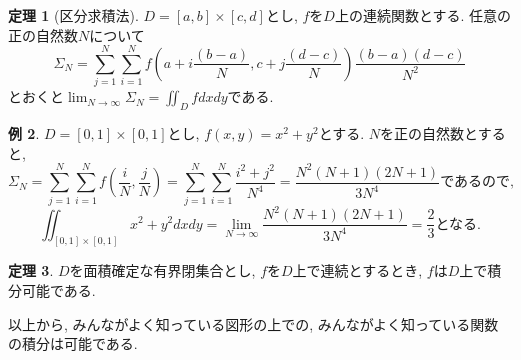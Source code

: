 \documentclass[dvipdfmx,a4paper,11pt]{article}
\theoremstyle{definition}
\newtheorem{thm}{定理}
\newtheorem{exa}[thm]{例}
\newcommand{\pdrv}[2]{\frac{\partial #1}{\partial #2}}
\begin{document}
       \begin{tcolorbox}[
    colback = white,
    colframe = green!35!black,
    fonttitle = \bfseries,
    breakable = true]
    \begin{thm}[区分求積法]
$D=[a,b] \times [c,d]$とし, 
$f$を$D$上の連続関数とする. 任意の正の自然数$N$について
$$
\Sigma_N=\sum_{j=1}^{N}\sum_{i=1}^{N}f\left(  a+i\frac{(b-a)}{N} ,c+j\frac{(d-c)}{N}\right)\frac{(b-a)(d-c)}{N^2}
$$
とおくと$\lim_{N \rightarrow \infty} \Sigma_{N} = \iint_{D} f dxdy$である.
        \end{thm}
    \end{tcolorbox}
\begin{exa}
$D=[0,1]\times [0,1]$とし, $f(x,y)=x^2+y^2$とする.
$N$を正の自然数とすると, 
$$\Sigma_{N}=
\sum_{j=1}^{N}\sum_{i=1}^{N}f\left( \frac{i}{N},\frac{j}{N}\right)
=\sum_{j=1}^{N}\sum_{i=1}^{N}\frac{i^2+j^2}{N^4} = \frac{N^2(N+1)(2N+1)}{3N^4}
\text{であるので, }
$$
$$
\iint_{[0,1]\times [0,1]} x^2+y^2 dxdy = \lim_{N \rightarrow \infty} \frac{N^2(N+1)(2N+1)}{3N^4}
= \frac{2}{3} \text{となる.}
$$

\end{exa}

\begin{tcolorbox}[
    colback = white,
    colframe = green!35!black,
    fonttitle = \bfseries,
    breakable = true]
    \begin{thm}
$D$を面積確定な有界閉集合とし, $f$を$D$上で連続とするとき, $f$は$D$上で積分可能である.
        \end{thm}
   \end{tcolorbox}
 以上から, みんながよく知っている図形の上での, みんながよく知っている関数の積分は可能である.
 
 
\end{document}

